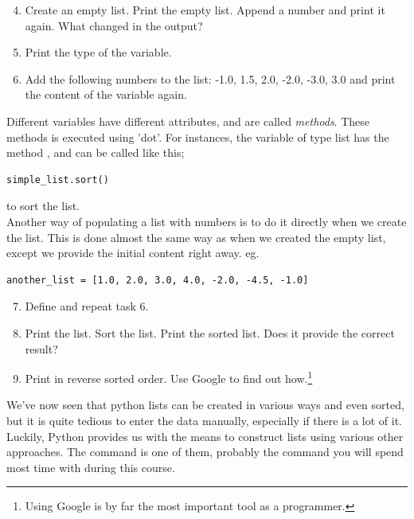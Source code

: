 \documentclass{article}
\begin{document}
\begin{enumerate}
  \setcounter{enumi}{3}
  \item Create an empty list.
    Print the empty list.
    Append a number and print it again.
    What changed in the output?

  \item Print the type of the variable.

  \item Add the following numbers to the list: -1.0, 1.5, 2.0, -2.0, -3.0, 3.0 and
    print the content of the variable again.
\end{enumerate}


Different variables have different attributes, and are called {\em methods}.
These methods is executed using 'dot'.
For instances,
the variable of type list has the method ,
and can be called like this;

\begin{lstlisting}
simple_list.sort()
\end{lstlisting}

to sort the list.\\

Another way of populating a list with numbers is to do it directly when
we create the list.
This is done almost the same way as when we created the empty list, except we
provide the initial content right away. eg.

\begin{lstlisting}
another_list = [1.0, 2.0, 3.0, 4.0, -2.0, -4.5, -1.0]
\end{lstlisting}


\begin{enumerate}
  \setcounter{enumi}{6}
  \item Define  and repeat task 6.

  \item Print the list. Sort the list. Print the sorted list.
  Does it provide the correct result?

  \item Print  in reverse sorted order.
    Use Google to find out how.\footnote{Using Google is
    by far the most important tool as a programmer.}
\end{enumerate}


We've now seen that python lists can be created in various ways and even
sorted, but it is quite tedious to enter the data manually, especially if
there is a lot of it.
Luckily, Python provides us with the means to construct
lists using various other approaches.
The  command is one of them, probably the
command you will spend most time with during this course.
\end{document}
